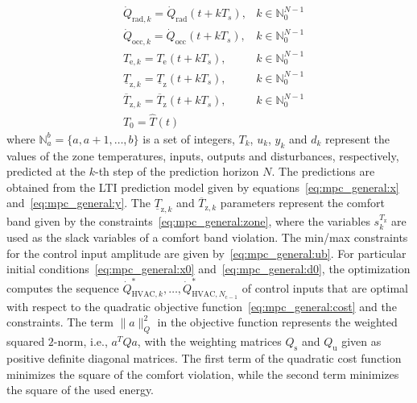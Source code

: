 \documentclass[10pt]{extarticle}
\begin{document}
\begin{subequations}
\begin{align}
   & \dot{Q}_{\text{rad},k} =  \dot{Q}_{\text{rad}}(t+ k T_s), & k \in \mathbb{N}_{0}^{N-1} \label{eq:mpc_general:d0} \\
   & \dot{Q}_{\text{occ},k} = \dot{Q}_{\text{occ}}(t+ k T_s), & k \in \mathbb{N}_{0}^{N-1} \label{eq:mpc_general:d0} \\
   & T_{\text{e},k} = T_{\text{e}}(t+ k T_s), & k \in \mathbb{N}_{0}^{N-1} \label{eq:mpc_general:d0} \\
  & \underline{T}_{\text{z},k} =  \underline{T}_{\text{z}}(t+ k T_s), & k \in \mathbb{N}_{0}^{N-1} \label{eq:mpc_general:r_low} \\
    & \overline{T}_{\text{z},k} =  \overline{T}_{\text{z}}(t+ k T_s), & k \in \mathbb{N}_{0}^{N-1} \label{eq:mpc_general:r_up} \\
  & T_0 = \hat{T}(t) \label{eq:mpc_general:x0}
\end{align}
\end{subequations}
where $\mathbb{N}_a^b = \{a, a+1, \ldots, b \}$ is a set of integers,
$T_k$, $u_k$, $y_k$ and $d_k$ represent the values of the zone temperatures, 
inputs, outputs and disturbances, respectively, 
predicted at the $k$-th step of the prediction horizon $N$.
The predictions are obtained from the LTI prediction
model given by equations~\eqref{eq:mpc_general:x} and~\eqref{eq:mpc_general:y}.
The $\underline{T}_{\text{z},k}$ and $\overline{T}_{\text{z},k}$ parameters represent the comfort band 
given by the constraints~\eqref{eq:mpc_general:zone},
where the variables $s^{T_{\text{z}}}_k$ are used as the slack variables of a comfort band violation.
The min/max constraints for the control input amplitude are given by~\eqref{eq:mpc_general:ub}.
For particular initial conditions~\eqref{eq:mpc_general:x0} and~\eqref{eq:mpc_general:d0}, 
 the optimization computes the sequence $\dot{Q}_{\text{HVAC},k}^*, \ldots, \dot{Q}_{\text{HVAC},N_{\text{c}-1}}^*$ of control inputs that
are optimal with respect to the quadratic objective function~\eqref{eq:mpc_general:cost}
and the constraints.
The term $\|a\|_Q^2$ in the objective function represents the weighted squared $2$-norm, i.e., $a^T Q a$,
with the weighting matrices $Q_\text{s}$ and $Q_\text{u}$ given as positive 
definite diagonal matrices.
The first term of the quadratic cost function minimizes the square of the comfort violation,
while the second term minimizes the square of the used energy.
\end{document}
